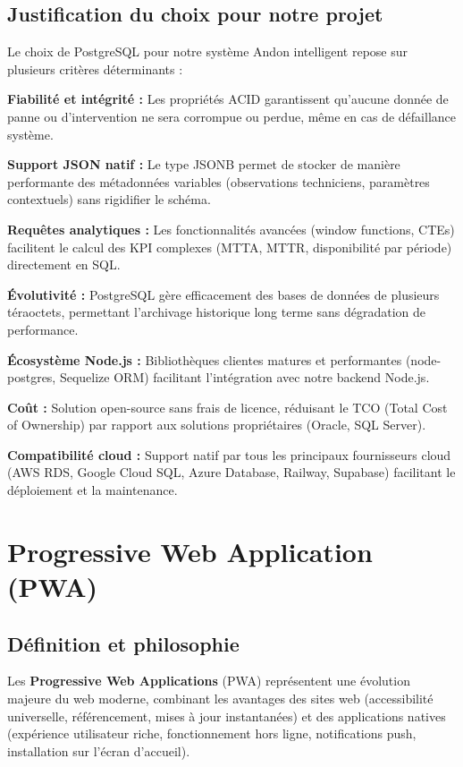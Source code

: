 \subsection{Justification du choix pour notre projet}

Le choix de PostgreSQL pour notre système Andon intelligent repose sur plusieurs critères déterminants :

\textbf{Fiabilité et intégrité :} Les propriétés ACID garantissent qu'aucune donnée de panne ou d'intervention ne sera corrompue ou perdue, même en cas de défaillance système.

\textbf{Support JSON natif :} Le type JSONB permet de stocker de manière performante des métadonnées variables (observations techniciens, paramètres contextuels) sans rigidifier le schéma.


\textbf{Requêtes analytiques :} Les fonctionnalités avancées (window functions, CTEs) facilitent le calcul des KPI complexes (MTTA, MTTR, disponibilité par période) directement en SQL.

\textbf{Évolutivité :} PostgreSQL gère efficacement des bases de données de plusieurs téraoctets, permettant l'archivage historique long terme sans dégradation de performance.

\textbf{Écosystème Node.js :} Bibliothèques clientes matures et performantes (node-postgres, Sequelize ORM) facilitant l'intégration avec notre backend Node.js.

\textbf{Coût :} Solution open-source sans frais de licence, réduisant le TCO (Total Cost of Ownership) par rapport aux solutions propriétaires (Oracle, SQL Server).

\textbf{Compatibilité cloud :} Support natif par tous les principaux fournisseurs cloud (AWS RDS, Google Cloud SQL, Azure Database, Railway, Supabase) facilitant le déploiement et la maintenance.

\section{Progressive Web Application (PWA)}

\subsection{Définition et philosophie}

Les \textbf{Progressive Web Applications} (PWA) représentent une évolution majeure du web moderne, combinant les avantages des sites web (accessibilité universelle, référencement, mises à jour instantanées) et des applications natives (expérience utilisateur riche, fonctionnement hors ligne, notifications push, installation sur l'écran d'accueil).

